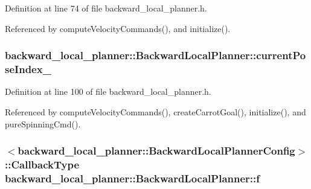 Definition at line 74 of file backward\+\_\+local\+\_\+planner.\+h.



Referenced by compute\+Velocity\+Commands(), and initialize().

\subsubsection[{\texorpdfstring{current\+Pose\+Index\+\_\+}{currentPoseIndex_}}]{ backward\+\_\+local\+\_\+planner\+::\+Backward\+Local\+Planner\+::current\+Pose\+Index\+\_\+\hspace{0.3cm}{\ttfamily [private]}}\hypertarget{classbackward__local__planner_1_1BackwardLocalPlanner_af2485562720c0ce3c895debdbdfc89f3}{}\label{classbackward__local__planner_1_1BackwardLocalPlanner_af2485562720c0ce3c895debdbdfc89f3}


Definition at line 100 of file backward\+\_\+local\+\_\+planner.\+h.



Referenced by compute\+Velocity\+Commands(), create\+Carrot\+Goal(), initialize(), and pure\+Spinning\+Cmd().

\subsubsection[{\texorpdfstring{f}{f}}]{$<$backward\+\_\+local\+\_\+planner\+::\+Backward\+Local\+Planner\+Config$>$\+::Callback\+Type backward\+\_\+local\+\_\+planner\+::\+Backward\+Local\+Planner\+::f\hspace{0.3cm}{\ttfamily [private]}}\hypertarget{classbackward__local__planner_1_1BackwardLocalPlanner_a6ef8d7b45a368abb6561ffd76f46f098}{}\label{classbackward__local__planner_1_1BackwardLocalPlanner_a6ef8d7b45a368abb6561ffd76f46f098}


